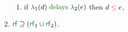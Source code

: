 \begin{multicols}{2}
\begin{enumerate}[topsep=0pt,label=(\textsc{s}\arabic*),ref=\textsc{s}\arabic*]
\begin{enumerate}[leftmargin=0pt]
      \item \label{seq-le-delays}
        if $\labeling_1(\bEv) \rdelays \labeling_2(\aEv)$ then
        $\bEv\le\aEv$,
      \end{enumerate}
      \item \label{seq-rf}
        ${\rrfx}\rsupset{\rrfx_1}{\rrfx_2}$.
    \end{enumerate}
  \end{multicols}
  \smallskip

